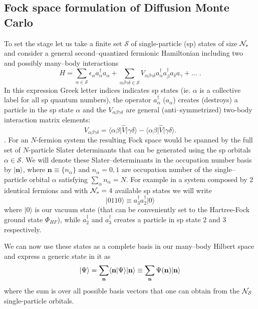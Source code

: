 \subsection{Fock space formulation of Diffusion Monte Carlo}
\label{sec:cimc}
To set the stage let us take a finite set $\mathcal{S}$ of single-particle (sp) states of size ${\cal N}_s$ and 
consider a general second--quantized fermionic Hamiltonian including two and possibly many--body interactions
\begin{equation}
\label{eqham}
H=\sum_{\alpha \in \mathcal{S}} \epsilon_\alpha a^{\dagger}_\alpha a_\alpha + \sum_{\alpha\beta\gamma\delta\in \mathcal{S}} V_{\alpha\beta\gamma\delta} a^{\dagger}_\alpha a^{\dagger}_\beta a_\delta a_\gamma + \dots \;.
\end{equation}
In this expression Greek letter indices indicates sp states (ie. $\alpha$ is a collective label for all sp quantum 
numbers), the operator $a^{\dagger}_\alpha$ ($a_\alpha$) creates (destroys) a particle in the sp state $\alpha$ 
and the $V_{\alpha\beta\gamma\delta}$ are general (anti--symmetrized) two-body interaction matrix elements:
\begin{equation}
\label{eq_ham}
V_{\alpha\beta\gamma\delta} = \langle \alpha \beta \lvert \hat{V} \rvert \gamma \delta \rangle - \langle \alpha \beta \lvert \hat{V} \rvert \gamma \delta \rangle .%
\end{equation}.
For an $N$-fermion system the resulting Fock space would be spanned by the full set of $N$-particle 
Slater determinants that can be generated using the sp orbitals $\alpha \in \mathcal{S}$. We will denote these 
Slater--determinants in the occupation number basis by $\rvert \mathbf{n} \rangle$, where $\mathbf{n} \equiv \{ n_\alpha \}$ and $n_\alpha = 0,1$ 
are occupation number of the single--particle orbital $\alpha$ satisfying $\sum_\alpha n_\alpha=N$. For
example in a system composed by 2 identical fermions and with ${\cal N}_s=4$ available sp states we will write
\begin{equation}
\rvert 0110 \rangle \equiv a^{\dagger}_3 a^{\dagger}_2 \rvert 0\rangle  
\end{equation}
where $\rvert 0 \rangle$ is our vacuum state (that can be conveniently set to the Hartree-Fock ground state $\Phi_{HF}$), while
$a^{\dagger}_2$ and $a^{\dagger}_3$ creates a particle in sp state $2$ and $3$ respectively.

We can now use these states as a complete basis in our many--body Hilbert space and express a generic state in it as 
\begin{equation}
\lvert \Psi \rangle = \sum_{\bf n} \langle \mathbf{n} \vert \Psi \rangle \lvert \mathbf{n} \rangle \equiv \sum_{\bf n} \Psi(\bf{n}) \lvert {\bf n} \rangle
\end{equation}
where the sum is over all possible basis vectors that one can obtain from the ${\cal N_S}$ single-particle orbitals.

